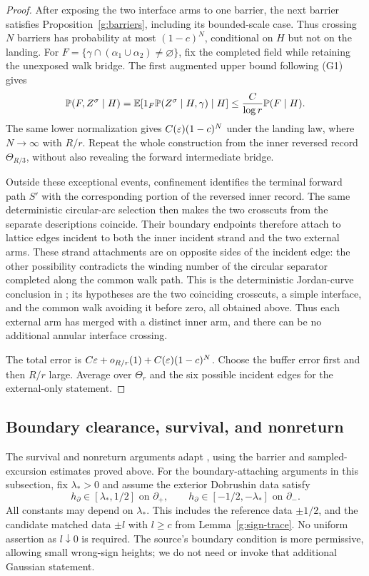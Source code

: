 \begin{proof}
After exposing the two interface arms to one barrier, the next
barrier satisfies Proposition~\ref{g:barriers}, including its
bounded-scale case. Thus crossing \(N\) barriers has probability
at most \((1-c)^N\), conditional on \(H\) but not on the landing.
For \(F=\{\gamma\cap(\alpha_1\cup\alpha_2)\ne\varnothing\}\),
fix the completed field while retaining the unexposed walk bridge.
The first augmented upper bound following (G1) gives
\[
 \mathbb P(F,Z^\sigma\mid H)
 =\mathbb E[1_F\mathbb P(Z^\sigma\mid H,\gamma)\mid H]
 \leq \frac{C}{\log r}\mathbb P(F\mid H).
\]
The same lower normalization gives \(C(\varepsilon)(1-c)^N\) under the
landing law, where \(N\to\infty\) with \(R/r\). Repeat the whole
construction from the inner reversed record \(\Theta_{R/3}\),
without also revealing the forward intermediate bridge.

Outside these exceptional events, confinement identifies the terminal
forward path \(S'\) with the corresponding portion of the reversed
inner record. The same deterministic circular-arc selection then
makes the two crosscuts from the separate descriptions coincide. Their
boundary endpoints therefore attach to lattice edges incident to both
the inner incident strand and the two external arms. These strand
attachments are on opposite sides of the incident
edge: the other possibility contradicts the winding number of
the circular separator completed along the common walk path.
This is the deterministic Jordan-curve conclusion in
\cite[final paragraphs of Lemma 3.17]{SSdiscrete}; its hypotheses
are the two coinciding crosscuts, a simple interface, and the
common walk avoiding it before zero, all obtained above.
Thus each external arm has merged with a distinct inner arm,
and there can be no additional annular interface crossing.

The total error is \(C\varepsilon+o_{R/r}(1)+C(\varepsilon)(1-c)^N\).
Choose the buffer error first and then \(R/r\) large.
Average over \(\Theta_r\) and the six possible incident edges
for the external-only statement.
\end{proof}

\subsection{Boundary clearance, survival, and nonreturn}

The survival and nonreturn arguments adapt
\cite[Lemma~3.26, especially equation (3.62)]{SSdiscrete}, using the
barrier and sampled-excursion estimates proved above.
For the boundary-attaching arguments in this subsection, fix
\(\lambda_*>0\) and assume the exterior Dobrushin data satisfy
\[
 h_\partial\in[\lambda_*,1/2]\text{ on }\partial_+,
 \qquad
 h_\partial\in[-1/2,-\lambda_*]\text{ on }\partial_-.
 \tag{GB}
\]
All constants may depend on \(\lambda_*\). This includes the reference
data \(\pm1/2\), and the candidate matched data \(\pm l\) with
\(l\geq c\) from Lemma~\ref{g:sign-trace}. No uniform assertion as
\(l\downarrow0\) is required. The source's boundary condition
\cite[condition \((\partial)\), Section 3.7]{SSdiscrete} is more
permissive, allowing small wrong-sign heights; we do not need or invoke
that additional Gaussian statement.

